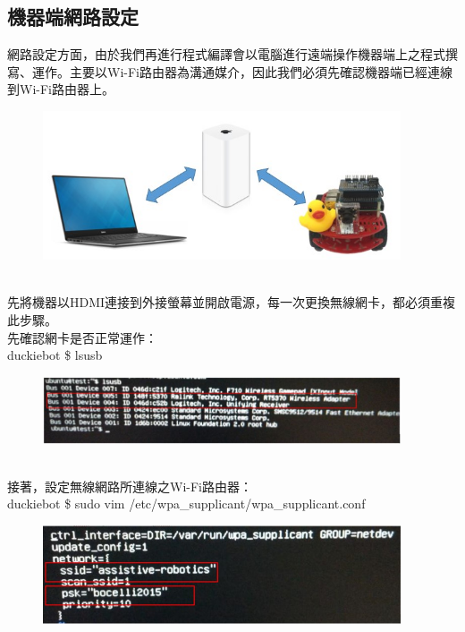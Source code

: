 \documentclass{article}
\begin{document}
\subsection{機器端網路設定}

網路設定方面，由於我們再進行程式編譯會以電腦進行遠端操作機器端上之程式撰寫、運作。主要以Wi-Fi路由器為溝通媒介，因此我們必須先確認機器端已經連線到Wi-Fi路由器上。
\begin{figure}[htp]
    \begin{center}
        \includegraphics[width=300pt]{pic/圖片9.jpg}
    \end{center}
\end{figure}
\\先將機器以HDMI連接到外接螢幕並開啟電源，每一次更換無線網卡，都必須重複此步驟。
\\先確認網卡是否正常運作：
\\duckiebot \$ lsusb
\begin{figure}[htp]
    \begin{center}
        \includegraphics[width=300pt]{pic/圖片10.jpg}
    \end{center}
\end{figure}
\\接著，設定無線網路所連線之Wi-Fi路由器：
\\duckiebot \$ sudo vim /etc/wpa\_supplicant/wpa\_supplicant.conf
\begin{figure}[htp]
    \begin{center}
        \includegraphics[width=300pt]{pic/圖片11.jpg}
    \end{center}
\end{figure}
\end{document}

